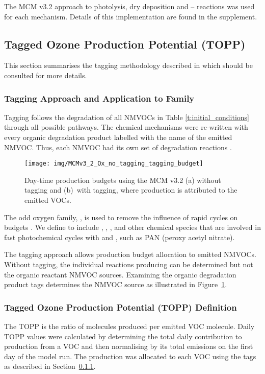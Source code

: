 The MCM v3.2 approach to photolysis, dry deposition and -- reactions was used for each mechanism. 
Details of this implementation are found in the supplement.

\subsection{Tagged Ozone Production Potential (TOPP)}
This section summarises the tagging methodology described in \citet{Butler:2011} which should be consulted for more details.

\subsubsection[Tagging Approach and Application to Ox Family]{Tagging Approach and Application to  Family} \label{ss:tagging} %

Tagging follows the degradation of all NMVOCs in Table \ref{t:initial_conditions} through all possible pathways. 
The chemical mechanisms were re-written with every organic degradation product labelled with the name of the emitted NMVOC. 
Thus, each NMVOC had its own set of degradation reactions \citep{Butler:2011}. 

\begin{figure}
    \centering
    \texttt{[image: img/MCMv3\_2\_Ox\_no\_tagging\_tagging\_budget]}
    \vspace{0mm}
    \caption{Day-time  production budgets using the MCM v3.2 (a) without tagging and \mbox{(b) with} tagging, where  production is attributed to the emitted VOCs.}
    \vspace{-4mm}
    \label{f:Ox_budget}
\end{figure} 

The odd oxygen family, , is used to remove the influence of rapid cycles on  budgets \citep{Seinfeld:2006}. 
We define  to include , , ,  and other chemical species that are involved in fast photochemical cycles with  and , such as PAN (peroxy acetyl nitrate).

The tagging approach allows production budget allocation to emitted NMVOCs. 
Without tagging, the individual reactions producing  can be determined but not the organic reactant NMVOC sources. 
Examining the organic degradation product tags determines the NMVOC source as illustrated in \mbox{Figure \ref{f:Ox_budget}}.

\subsubsection{Tagged Ozone Production Potential (TOPP) Definition} %

The TOPP is the ratio of  molecules produced per emitted VOC molecule.  
Daily TOPP values were calculated by determining the total daily contribution to  production from a VOC and then normalising by its total emissions on the first day of the model run. 
The  production was allocated to each VOC using the tags as described in \mbox{Section \ref{ss:tagging}}. 
